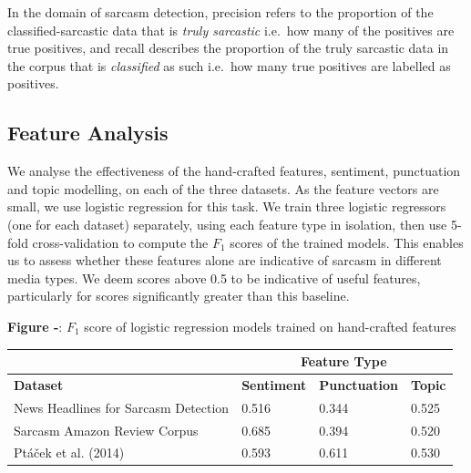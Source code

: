\documentclass[12pt,a4paper]{article}
\begin{document}
\noindent In the domain of sarcasm detection, precision refers to the proportion of the classified-sarcastic data that is \textit{truly sarcastic} i.e.\ how many of the positives are true positives, and recall describes the proportion of the truly sarcastic data in the corpus that is \textit{classified} as such i.e.\ how many true positives are labelled as positives. \\


\subsection{Feature Analysis}
\noindent We analyse the effectiveness of the hand-crafted features, sentiment, punctuation and topic modelling, on each of the three datasets. As the feature vectors are small, we use logistic regression for this task. We train three logistic regressors (one for each dataset) separately, using each feature type in isolation, then use 5-fold cross-validation to compute the $F_1$ scores of the trained models. This enables us to assess whether these features alone are indicative of sarcasm in different media types. We deem scores above 0.5 to be indicative of useful features, particularly for scores significantly greater than this baseline.


\begin{center}
	\textbf{Figure -}: $F_1$ score of logistic regression models trained on hand-crafted features
\end{center}

\begin{center}
	\begin{tabular}{|p{7cm}|p{1.8cm}|p{2.6cm}|p{1.6cm}|} 
		\hline
		& \multicolumn{3}{|c|}{\textbf{Feature Type}} \\
		\hline
		\textbf{Dataset} & \textbf{Sentiment} & \textbf{Punctuation} & \textbf{Topic} \\ [0.4ex] 
		\hline\hline
		News Headlines for Sarcasm Detection & 0.516 & 0.344 & 0.525\\ 
		\hline
		Sarcasm Amazon Review Corpus & 0.685 & 0.394 & 0.520\\ 
		\hline
		Pt\'a\v{c}ek et al. (2014) & 0.593 & 0.611 & 0.530\\
		\hline
	\end{tabular}
\end{center}
\end{document}
